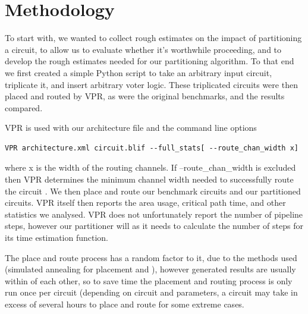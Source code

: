 \documentclass[12pt,drafta4paper,oneside]{memoir} %
\begin{document}
\section{Methodology}
To start with, we wanted to collect rough estimates on the impact of partitioning a circuit, to allow us to evaluate whether it's worthwhile proceeding, and to develop the rough estimates needed for our partitioning algorithm. To that end we first created a simple Python script to take an arbitrary input circuit, triplicate it, and insert arbitrary voter logic. These triplicated circuits were then placed and routed by \ac{VPR}, as were the original benchmarks, and the results compared.

\ac{VPR} is used with our architecture file  and the command line options 
\begin{lstlisting}
VPR architecture.xml circuit.blif --full_stats[ --route_chan_width x]
\end{lstlisting} where x is the width of the routing channels.
If --route\_chan\_width is excluded then \ac{VPR} determines the minimum channel width needed to successfully route the circuit . We then place and route our benchmark circuits and our partitioned circuits. \ac{VPR} itself then reports the area usage, critical path time, and other statistics we analysed. \ac{VPR} does not unfortunately report the number of pipeline steps, however our partitioner will as it needs to calculate the number of steps for its time estimation function.

The place and route process has a random factor to it, due to the methods used (simulated annealing for placement  and ), however generated results are usually within  of each other, so to save time the placement and routing process is only run once per circuit (depending on circuit and parameters, a circuit may take in excess of several hours to place and route for some extreme cases.
\end{document}
